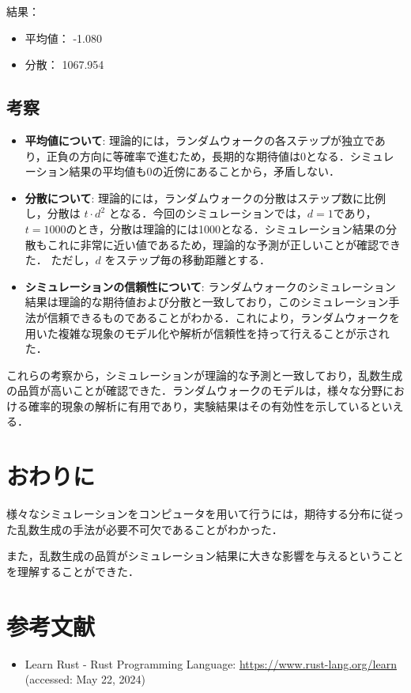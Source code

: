 \documentclass[fleqn, a4paper. 12pt]{jsarticle}
\begin{document}
    結果：
    \begin{itemize}
        \item 平均値： -1.080
        \item 分散： 1067.954
    \end{itemize}
    
    \subsection*{考察}
    \begin{itemize}
        \item \textbf{平均値について}: 理論的には，ランダムウォークの各ステップが独立であり，正負の方向に等確率で進むため，長期的な期待値は0となる．シミュレーション結果の平均値も0の近傍にあることから，矛盾しない．
        \item \textbf{分散について}: 理論的には，ランダムウォークの分散はステップ数に比例し，分散は $t \cdot d^2$ となる．今回のシミュレーションでは，$d = 1$であり，$t = 1000$のとき，分散は理論的には1000となる．シミュレーション結果の分散もこれに非常に近い値であるため，理論的な予測が正しいことが確認できた．
        ただし，$d$ をステップ毎の移動距離とする．
        \item \textbf{シミュレーションの信頼性について}: ランダムウォークのシミュレーション結果は理論的な期待値および分散と一致しており，このシミュレーション手法が信頼できるものであることがわかる．これにより，ランダムウォークを用いた複雑な現象のモデル化や解析が信頼性を持って行えることが示された．
    \end{itemize}
    
    これらの考察から，シミュレーションが理論的な予測と一致しており，乱数生成の品質が高いことが確認できた．ランダムウォークのモデルは，様々な分野における確率的現象の解析に有用であり，実験結果はその有効性を示しているといえる．
    
  \newpage

  \section*{おわりに}

    様々なシミュレーションをコンピュータを用いて行うには，期待する分布に従った乱数生成の手法が必要不可欠であることがわかった．
    
    また，乱数生成の品質がシミュレーション結果に大きな影響を与えるということを理解することができた．

  \newpage
  
  \section*{参考文献}

    \begin{itemize}
        \item Learn Rust - Rust Programming Language: \url{https://www.rust-lang.org/learn} (accessed: May 22, 2024)
    \end{itemize}
\end{document}

